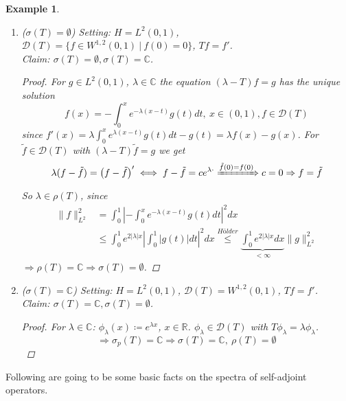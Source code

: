 \documentclass[12pt]{extreport} %
\newcommand{\C}{\mathbb{C}}
\newcommand{\R}{\mathbb{R}}
\newcommand{\DO}[1]{\mathcal{D}\left( {#1} \right)}
\theoremstyle{named}
\theoremstyle{nnamed}
\theoremstyle{itshape}
\theoremstyle{normal}
\newtheorem*{example}{Example}
\begin{document}
\begin{example} ~\
	\begin{enumerate}
		\item ($\sigma(T) = \emptyset$) Setting: $H = L^2(0,1)$, $\DO{T} = \{ f \in W^{1,2}(0,1) ~|~ f(0) = 0 \}$, $Tf = f'$. ~\\
			Claim: $\sigma(T) = \emptyset, \sigma(T) = \C$.
			\begin{proof}
				For $g \in L^2(0,1)$, $\lambda \in \C$ the equation $(\lambda - T) f = g$ has the unique solution
				$$ f(x) = - \int_0^x e^{-\lambda(x-t)} g(t) dt, ~x \in (0, 1), f \in \DO{T} $$
				since $f'(x) = \lambda \int_0^x e^{\lambda (x-t)} g(t) dt - g(t) = \lambda f(x)-g(x)$. For $\tilde{f} \in \DO{T}$ with $(\lambda - T) \tilde{f} = g$ we get
				$$ \lambda(f - \tilde{f}) = \left(f - \tilde{f} \right)' \iff f - \tilde{f} = c e^{\lambda \cdot} \xRightarrow[]{\tilde{f}(0) = f(0)} c = 0 \Rightarrow f = \tilde{f} $$
				So $\lambda \in \rho(T)$, since
				\begin{align*}
					\| f \|_{L^2}^2 & = \int_0^1 \left| - \int_0^x e^{-\lambda(x-t)} g(t) dt \right|^2 dx \\
						& \leq \int_0^1 e^{2 |\lambda| x } \left| \int_0^1 |g(t)| dt \right|^2 dx \overset{Hölder}{\leq} \underbrace{\int_0^1 e^{2|\lambda|x} dx}_{< \infty} \| g \|_{L^2}^2
				\end{align*}
				$\Rightarrow \rho(T) = \C \Rightarrow \sigma(T) = \emptyset$.
			\end{proof}
		\item ($\sigma(T) = \C$) Setting: $H = L^2(0,1)$, $\DO{T} = W^{1,2}(0,1)$, $Tf = f'$. ~\\
			Claim: $\sigma(T) = \C, \sigma(T) = \emptyset$.
			\begin{proof}
				For $\lambda \in \C$: $\phi_\lambda(x) \coloneqq e^{\lambda x}$, $x \in \R$. $\phi_\lambda \in \DO{T}$ with $T \phi_\lambda = \lambda \phi_\lambda$.
					$$ \Rightarrow \sigma_p(T) = \C \Rightarrow \sigma(T) = \C, ~\rho(T) = \emptyset $$
			\end{proof}
	\end{enumerate}	
\end{example}

Following are going to be some basic facts on the spectra of self-adjoint operators.
\end{document}
